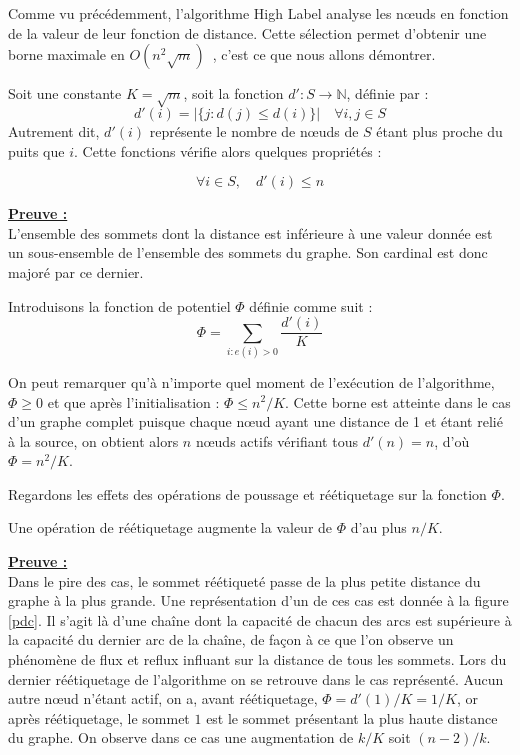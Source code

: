 Comme vu précédemment, l'algorithme High Label analyse les n\oe uds en fonction de la valeur de leur
fonction de distance. Cette sélection permet d'obtenir une borne maximale en
$O(n^2\sqrt{m})$~\cite{ahuj93}, c'est ce que nous allons démontrer.

Soit une constante $K = \sqrt{m}$, soit la fonction $d': S \longrightarrow \mathbb{N}$, définie par
: $$
d'(i) = |\{j : d(j) \leq d(i) \}| \quad \forall i,j \in S $$
Autrement dit, $d'(i)$ représente le nombre de n\oe uds de $S$ étant plus proche du puits que $i$.
Cette fonctions vérifie alors quelques propriétés : 
\begin{lemma}
	$$\forall i \in S, \quad d'(i) \leq n$$
\end{lemma}

\underline{\textbf{Preuve :}}\\
L'ensemble des sommets dont la distance est inférieure à une valeur donnée est un sous-ensemble de
l'ensemble des sommets du graphe. Son cardinal est donc majoré par ce dernier.

Introduisons la fonction de potentiel $\Phi$ définie comme suit : $$
\Phi = \sum_{i : e(i) > 0} \frac{d'(i)}{K}$$

On peut remarquer qu'à n'importe quel moment de l'exécution de l'algorithme, $\Phi \geq 0$ et que
après l'initialisation : $\Phi \leq n^2 / K$. Cette borne est atteinte dans le cas d'un graphe
complet puisque chaque n\oe ud ayant une distance de 1 et étant relié à la source, on obtient alors
$n$ n\oe uds actifs vérifiant tous $d'(n) = n$, d'où $\Phi = n^2/K$.

Regardons les effets des opérations de poussage et réétiquetage sur la fonction $\Phi$.

\begin{lemma}
	Une opération de réétiquetage augmente la valeur de $\Phi$ d'au plus $n/K$.
\end{lemma}

\underline{\textbf{Preuve :}}\\Dans le pire des cas, le sommet réétiqueté passe de la plus petite
distance du graphe à la plus grande. Une représentation d'un de ces cas est donnée à la figure \ref{pdc}. Il
s'agit là d'une chaîne dont la capacité de chacun des arcs est supérieure à la capacité du dernier
arc de la chaîne, de façon à ce que l'on observe un phénomène de flux et reflux influant sur la
distance de tous les sommets. Lors du dernier réétiquetage de l'algorithme on se retrouve dans le
cas représenté.
Aucun autre n\oe ud n'étant actif, on a, avant réétiquetage, $\Phi = d'(1) / K = 1/K$, or après
réétiquetage, le sommet $1$ est le sommet présentant la plus haute distance du graphe. On observe
dans ce cas une augmentation de $k/K$ soit $(n-2)/k$.

